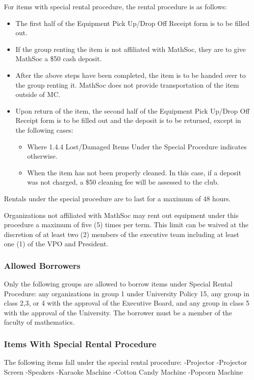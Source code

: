 For items with special rental procedure, the rental procedure is as follows:
\begin{itemize}
    \item The first half of the Equipment Pick Up/Drop Off Receipt form is to be filled out.
    \item If the group renting the item is not affiliated with MathSoc, they are to give MathSoc a \$50 cash deposit.
    \item After the above steps have been completed, the item is to be handed over to the group renting it. MathSoc does not provide transportation of the item outside of MC.
    \item Upon return of the item, the second half of the Equipment Pick Up/Drop Off Receipt form is to be filled out and the deposit is to be returned, except in the following cases:
    \begin{itemize}
        \item Where 1.4.4 Lost/Damaged Items Under the Special Procedure indicates otherwise.
        \item When the item has not been properly cleaned. In this case, if a deposit was not charged, a \$50 cleaning fee will be assessed to the club.
    \end{itemize}
\end{itemize}

Rentals under the special procedure are to last for a maximum of 48 hours.

Organizations not affiliated with MathSoc may rent out equipment under this procedure a maximum of five (5) times per term. This limit can be waived at the discretion of at least two (2) members of the executive team including at least one (1) of the VPO and President.

\subsubsection{Allowed Borrowers}
Only the following groups are allowed to borrow items under Special Rental Procedure: any organizations in group 1 under University Policy 15, any group in class 2,3, or 4 with the approval of the Executive Board, and any group in class 5 with the approval of the University. The borrower must be a member of the faculty of mathematics.

\subsubsection{Items With Special Rental Procedure}
The following items fall under the special rental procedure:
-Projector
-Projector Screen
-Speakers
-Karaoke Machine
-Cotton Candy Machine
-Popcorn Machine

